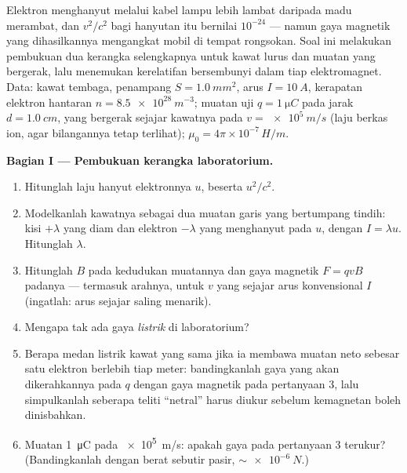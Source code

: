 \begin{problem}\label{pb:b3:covariant-electromagnetism:1}
Elektron menghanyut melalui kabel lampu lebih lambat daripada madu
merambat, dan $v^2/c^2$ bagi hanyutan itu bernilai $10^{-24}$ --- namun
gaya magnetik yang dihasilkannya mengangkat mobil di tempat rongsokan.
Soal ini melakukan pembukuan dua kerangka selengkapnya untuk kawat lurus
dan muatan yang bergerak, lalu menemukan kerelatifan bersembunyi dalam
tiap elektromagnet. Data: kawat tembaga, penampang $S = \qty{1.0}{mm^2}$,
arus $I = \qty{10}{A}$, kerapatan elektron hantaran
$n = \qty{8.5e28}{m^{-3}}$; muatan uji
$q = \qty{1}{\micro C}$ pada jarak $d = \qty{1.0}{cm}$, yang bergerak
sejajar kawatnya pada $v = \qty{e5}{m/s}$ (laju berkas ion, agar
bilangannya tetap terlihat); $\mu_0 = 4\pi\times10^{-7}\,\unit{H/m}$.

\medskip\noindent\textbf{Bagian I --- Pembukuan kerangka laboratorium.}
\begin{enumerate}
  \item Hitunglah laju hanyut elektronnya $u$, beserta $u^2/c^2$.
  \item Modelkanlah kawatnya sebagai dua muatan garis yang bertumpang
        tindih: kisi $+\lambda$ yang diam dan elektron $-\lambda$ yang
        menghanyut pada $u$, dengan $I = \lambda u$. Hitunglah $\lambda$.
  \item Hitunglah $B$ pada kedudukan muatannya dan gaya magnetik
        $F = qvB$ padanya --- termasuk arahnya, untuk $v$ yang sejajar
        arus konvensional $I$ (ingatlah: arus sejajar saling menarik).
  \item Mengapa tak ada gaya \emph{listrik} di laboratorium?
  \item Berapa medan listrik kawat yang sama jika ia membawa muatan
        neto sebesar satu elektron berlebih tiap meter: bandingkanlah
        gaya yang akan dikerahkannya pada $q$ dengan gaya magnetik pada
        pertanyaan 3, lalu simpulkanlah seberapa teliti ``netral'' harus
        diukur sebelum kemagnetan boleh dinisbahkan.
  \item Muatan \qty{1}{\micro C} pada \qty{e5}{m/s}: apakah gaya pada
        pertanyaan 3 terukur? (Bandingkanlah dengan berat sebutir pasir,
        $\sim\qty{e-6}{N}$.)
\end{enumerate}


\end{problem}
